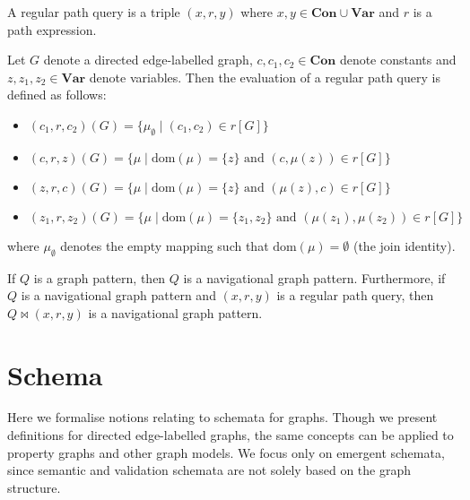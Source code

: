 \begin{definition}\label{def:regular-path-query}
    A regular path query is a triple $(x, r, y)$ where $x, y \in \textbf{Con} \cup \textbf{Var}$ and $r$ is a path expression.
\end{definition}

\begin{definition}\label{def:regular-path-query-evaluation}
    Let $G$ denote a directed edge-labelled graph, $c, c_1, c_2 \in \textbf{Con}$ denote constants and $z, z_1, z_2 \in \textbf{Var}$ denote variables. Then the evaluation of a regular path query is defined as follows:
    \begin{itemize}
        \item $(c_1, r, c_2)(G) = \{\mu_\emptyset \mid (c_1, c_2) \in r[G]\}$
        \item $(c, r, z)(G) = \{\mu \mid \text{dom}(\mu) = \{z\} \text{ and } (c, \mu(z)) \in r[G]\}$
        \item $(z, r, c)(G) = \{\mu \mid \text{dom}(\mu) = \{z\} \text{ and } (\mu(z), c) \in r[G]\}$
        \item $(z_1, r, z_2)(G) = \{\mu \mid \text{dom}(\mu) = \{z_1, z_2\} \text{ and } (\mu(z_1), \mu(z_2)) \in r[G]\}$
    \end{itemize}
    where $\mu_\emptyset$ denotes the empty mapping such that $\text{dom}(\mu) = \emptyset$ (the join identity).
\end{definition}

\begin{definition}\label{def:navigational-graph-pattern}
    If $Q$ is a graph pattern, then $Q$ is a navigational graph pattern. Furthermore, if $Q$ is a navigational graph pattern and $(x, r, y)$ is a regular path query, then $Q \Join (x, r, y)$ is a navigational graph pattern.
\end{definition}

\section{Schema}\label{app:schema}
Here we formalise notions relating to schemata for graphs. Though we present definitions for directed edge-labelled graphs, the same concepts can be applied to property graphs and other graph models. We focus only on emergent schemata, since semantic and validation schemata are not solely based on the graph structure.
